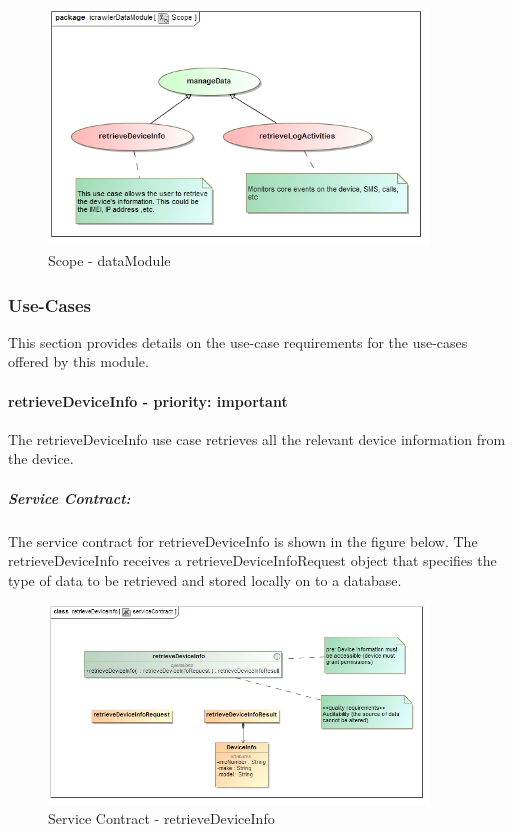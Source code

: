 \documentclass[hidelinks, 12pt, oneside]{article}
\begin{document}
		\begin{figure}[!htbp]
    		\centering
    		\includegraphics[width=0.9\textwidth]{img/scopeData.jpg}
    		\caption{Scope - dataModule}
    		\label{fig:Scope_dataModule}
		\end{figure}	
		
		
	\subsubsection{Use-Cases}
		This section provides details on the use-case requirements for the use-cases offered by this module.	
		
	\paragraph{retrieveDeviceInfo - priority: important}
		The retrieveDeviceInfo use case retrieves all the relevant device information from the device.\newline
		
		\subparagraph{Service Contract:}
		The service contract for retrieveDeviceInfo is shown in the figure below. The retrieveDeviceInfo 			receives a retrieveDeviceInfoRequest object that specifies the type of data to be retrieved and 			stored locally on to a database.
		
		
		\begin{figure}[!htbp]
    		\centering
    		\includegraphics[width=0.9\textwidth]{img/serviceContractRetrieveDeviceInfo.jpg}
    		\caption{Service Contract - retrieveDeviceInfo}
    		\label{fig:ServiceCon_retrieveDeviceInfo}
		\end{figure}
				
\end{document}
